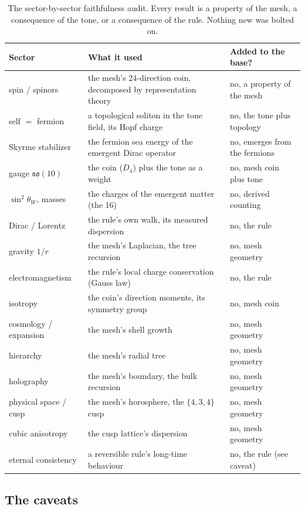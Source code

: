 \begin{table}[h]
\centering
\begin{tabular}{l p{6.2cm} l}
\toprule
Sector & What it used & Added to the base? \\
\midrule
spin / spinors & the mesh's 24-direction coin, decomposed by representation theory & no, a property of the mesh \\
self $=$ fermion & a topological soliton in the tone field, its Hopf charge & no, the tone plus topology \\
Skyrme stabilizer & the fermion sea energy of the emergent Dirac operator & no, emerges from the fermions \\
gauge $\mathfrak{so}(10)$ & the coin ($D_4$) plus the tone as a weight & no, mesh coin plus tone \\
$\sin^2\theta_W$, masses & the charges of the emergent matter (the 16) & no, derived counting \\
Dirac / Lorentz & the rule's own walk, its measured dispersion & no, the rule \\
gravity $1/r$ & the mesh's Laplacian, the tree recursion & no, mesh geometry \\
electromagnetism & the rule's local charge conservation (Gauss law) & no, the rule \\
isotropy & the coin's direction moments, its symmetry group & no, mesh coin \\
cosmology / expansion & the mesh's shell growth & no, mesh geometry \\
hierarchy & the mesh's radial tree & no, mesh geometry \\
holography & the mesh's boundary, the bulk recursion & no, mesh geometry \\
physical space / cusp & the mesh's horosphere, the $\{4,3,4\}$ cusp & no, mesh geometry \\
cubic anisotropy & the cusp lattice's dispersion & no, mesh geometry \\
eternal consistency & a reversible rule's long-time behaviour & no, the rule (see caveat) \\
\bottomrule
\end{tabular}
\caption{The sector-by-sector faithfulness audit. Every result is a property of the mesh, a consequence of the
tone, or a consequence of the rule. Nothing new was bolted on.}
\label{tab:faithfulness}
\end{table}

\subsection{The caveats}

